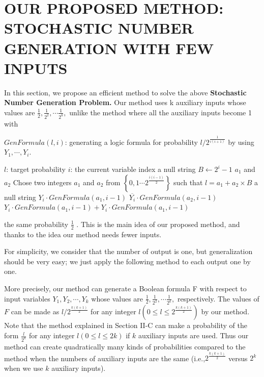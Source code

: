 \documentclass[10pt,conference]{IEEEtran}
\begin{document}
\section{ OUR PROPOSED METHOD: STOCHASTIC NUMBER GENERATION WITH FEW INPUTS}
\par
In this section, we propose an efficient method to solve the
above \textbf {Stochastic Number Generation Problem.} Our method
uses k auxiliary inputs whose values are $\frac{1}{2},\frac{1}{2^2}, \cdots \frac{1}{2^k}, $ unlike the method \cite{fifteen} where all the auxiliary inputs become 1 with
\begin{algorithm}
    \caption {$GenFormula(l, i)$: generating a logic formula
    for probability $l/{2^\frac{1}{i(i+1)}}$ by using $Y_1, \cdots , Y_i$.
    }
    \begin{algorithmic}[1]
    \Require
      \Statex $l$: target probability
    \Require
        \Statex$i$: the current variable index
    \State \Return a null string
    \Else  \State $B \gets 2^i-1$
    \State $a_1$ and $a_2$ \gets Chose two integers $a_1$ and $a_2$ from $\left \{ 0,1\cdots 2^\frac{i(i-1)}{2} \right \}$
 such that $l = a_1 + a_2 \times B$
    \State \Return a null string
    \EndIf
    \State \Return $Y_i \cdot GenFormula(a_1, i - 1)$
    \EndIf
    \State \Return $\overline{Y_i} \cdot GenFormula(a_2, i - 1)$
    \EndIf
    \State \Return $Y_i \cdot GenFormula(a_1, i - 1) + Y_i \cdot GenFormula(a_1, i - 1)$
    \EndIf
    \EndIf
  \end{algorithmic}
\end{algorithm}
the same probability $\frac{1}{2}$ . This is the main idea of our proposed
method, and thanks to the idea our method needs fewer inputs.

\par
For simplicity, we consider that the number of output is
one, but generalization should be very easy; we just apply the
following method to each output one by one.

\par
More precisely, our method can generate a Boolean formula
F with respect to input variables $Y_1, Y_2, \cdots , Y_k$ whose values
are $\frac{1}{2},\frac{1}{2^2}, \cdots \frac{1}{2^k},$ respectively. The values of $F$ can be made
as $l/2^{\frac{k(k+1)}{2}}$ for any integer $l (0 \leq l \leq 2^{\frac{k(k+1)}{2}})$ by our method. Note that the method \cite{fifteen} explained in Section II-C can make
a probability of the form $\frac{l}{2^k}$ for any integer $l (0 \leq l \leq 2k)$
if $k$ auxiliary inputs are used. Thus our method can create
quadratically many kinds of probabilities compared to the
method \cite{fifteen} when the numbers of auxiliary inputs are the
same (i.e.,$2^{\frac{k(k+1)}{2}}$ versus $2^k$ when we use $k$ auxiliary inputs).
\end{document}
